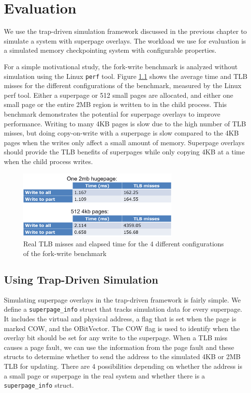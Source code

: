 \chapter{Evaluation}

We use the trap-driven simulation framework discussed in the previous chapter to simulate a system with superpage overlays. The workload we use for evaluation is a simulated memory checkpointing system with configurable properties.

For a simple motivational study, the fork-write benchmark is analyzed without simulation using the Linux \verb|perf| tool. Figure \ref{fig:tables} shows the average time and TLB misses for the different configurations of the benchmark, measured by the Linux perf tool. Either a superpage or 512 small pages are allocated, and either one small page or the entire 2MB region is written to in the child process. This benchmark demonstrates the potential for superpage overlays to improve performance. Writing to many 4KB pages is slow due to the high number of TLB misses, but doing copy-on-write with a superpage is slow compared to the 4KB pages when the writes only affect a small amount of memory. Superpage overlays should provide the TLB benefits of superpages while only copying 4KB at a time when the child process writes.
\begin{figure}
    \centering
    \includegraphics[width=3.2in]{Figures/Table1}
    \caption{Real TLB misses and elapsed time for the 4 different configurations of the fork-write benchmark}
    \label{fig:tables}
\end{figure}

\section{Using Trap-Driven Simulation}

Simulating superpage overlays in the trap-driven framework is fairly simple. We define a \verb|superpage_info| struct that tracks simulation data for every superpage. It includes the virtual and physical address, a flag that is set when the page is marked COW, and the OBitVector. The COW flag is used to identify when the overlay bit should be set for any write to the superpage. When a TLB miss causes a page fault, we can use the information from the page fault and these structs to determine whether to send the address to the simulated 4KB or 2MB TLB for updating. There are 4 possibilities depending on whether the address is a small page or superpage in the real system and whether there is a \verb|superpage_info| struct.

